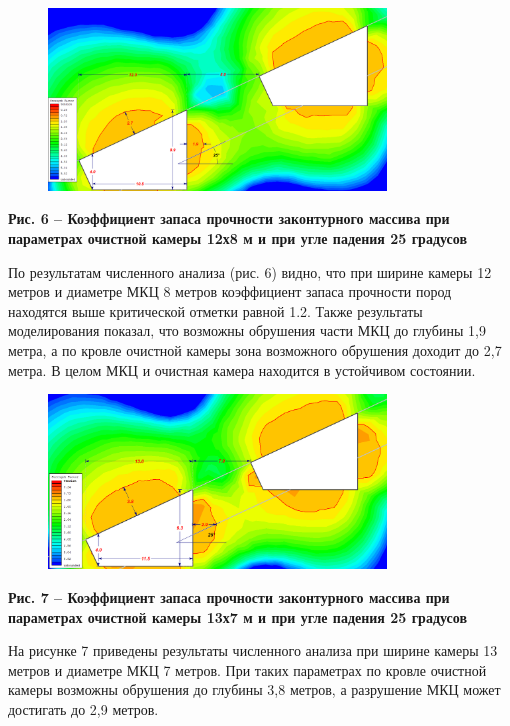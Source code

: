 \begin{figure}[H]
	\centering
	\includegraphics[width=0.8\textwidth]{assets/286}
	\caption*{}
\end{figure}

{\bfseries Рис. 6 -- Коэффициент запаса прочности законтурного массива при
параметрах очистной камеры 12х8 м и при угле падения 25 градусов}

По результатам численного анализа (рис. 6) видно, что при ширине камеры
12 метров и диаметре МКЦ 8 метров коэффициент запаса прочности пород
находятся выше критической отметки равной 1.2. Также результаты
моделирования показал, что возможны обрушения части МКЦ до глубины 1,9
метра, а по кровле очистной камеры зона возможного обрушения доходит до
2,7 метра. В целом МКЦ и очистная камера находится в устойчивом
состоянии.

\begin{figure}[H]
	\centering
	\includegraphics[width=0.8\textwidth]{assets/287}
	\caption*{}
\end{figure}

{\bfseries Рис. 7 -- Коэффициент запаса прочности законтурного массива при
параметрах очистной камеры 13х7 м и при угле падения 25 градусов}

На рисунке 7 приведены результаты численного анализа при ширине камеры
13 метров и диаметре МКЦ 7 метров. При таких параметрах по кровле
очистной камеры возможны обрушения до глубины 3,8 метров, а разрушение
МКЦ может достигать до 2,9 метров.

